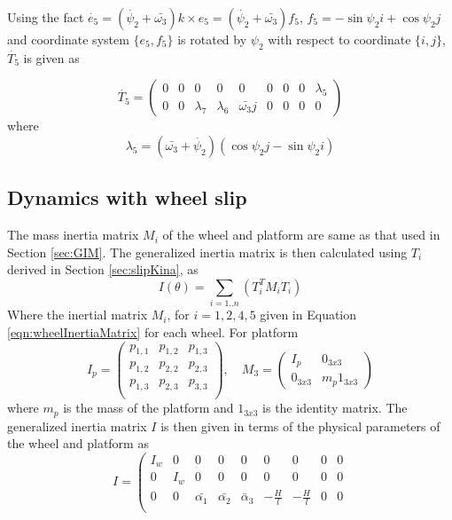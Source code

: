 {Using the fact $\dot{e_5}=(\dot{\psi_2}+\bar{\omega_3})k\times e_5 =(\dot{\psi_2}+\bar{\omega_3})f_5$,  $f_5=-\sin \psi_2 i+\cos \psi_2 j$ and coordinate system $\{e_5,f_5\}$ is rotated by $\psi_2$ with respect to coordinate $ \{i,j\}$, $\dot{T_5}$ is given as

\begin{equation}
\label{eqn:slip_dT5}
\dot{T_5}=
\begin{pmatrix}
0 & 0 & 0 & 0 & 0 & 0 & 0 & 0 & \lambda_5\\
0 & 0 & \lambda_7 & \lambda_6 & \bar{\omega_3}j & 0 & 0 & 0 & 0
\end{pmatrix}
\end{equation}
where 
\[ \lambda_5 = (\bar{\omega_3}+\dot{\psi_2}) (\cos\psi_2 j-\sin \psi_2 i) \]
\subsection{Dynamics  with wheel slip}
\label{sec:slipDynamics}
The mass inertia matrix $M_i$ of the wheel and platform are same as that used in Section \ref{sec:GIM}. The generalized inertia matrix is then calculated using $T_i$ derived in Section  \ref{sec:slipKina}, as
\begin{equation}
I(\theta)=\sum_{i=1..n}(T_i^TM_iT_i)
\end{equation}
Where the inertial matrix $M_i$, for $ i=1,2,4,5$ given in Equation \ref{eqn:wheelInertiaMatrix} for each wheel. For platform  \[ I_p=\begin{pmatrix}
 p_{1,1} & p_{1,2} & p_{1,3}\\   
 p_{1,2} & p_{2,2} & p_{2,3}\\   
 p_{1,3} & p_{2,3} & p_{3,3}\\   
\end{pmatrix},  \quad  M_3=\begin{pmatrix}
 I_p & 0_{3x3}\\
 0_{3x3} & m_p 1_{3x3}
\end{pmatrix}\]
where $m_p$ is the mass of the platform and $1_{3x3}$ is the identity matrix.
The generalized inertia matrix $I$ is then given in terms of the  physical parameters of the wheel and platform as 
\begin{equation}
    I=
    \left(
\begin{array}{ccccccccc}
I_w & 0 & 0 & 0 & 0 & 0 & 0 & 0 & 0 \\
 0 & I_w & 0 & 0 & 0 & 0 & 0 & 0 & 0 \\
 0 & 0 & \bar{\alpha_1} & \bar{\alpha_2} & \bar \alpha_3  & -\frac{H}{l} & -\frac{H}{l} & 0 & 0 \\

\end{array}
\end{equation}}

